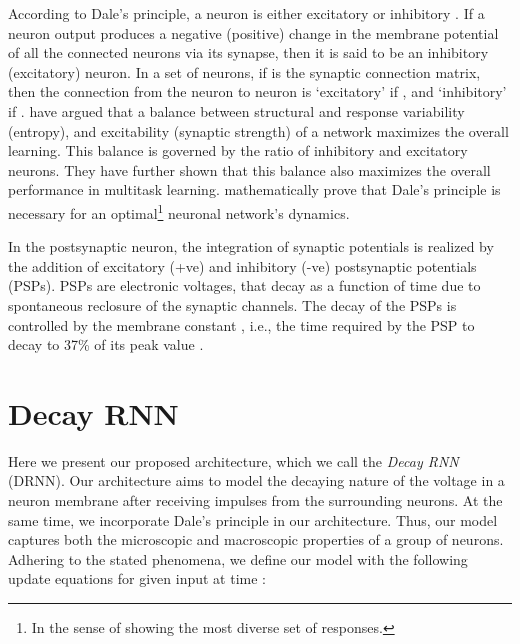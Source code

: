 \documentclass[11pt,a4paper]{article}
\begin{document}
According to Dale's principle, a neuron is either excitatory or inhibitory \cite{eccles1976electrical}. If a neuron output produces a negative (positive) change in the membrane potential of all the connected neurons via its synapse, then it is said to be an inhibitory (excitatory) neuron. In a set of  neurons, if  is the synaptic connection matrix, then the connection from the neuron  to neuron  is `excitatory' if , and `inhibitory' if .  \citet{capano2015optimal} have argued that a balance between structural and response variability (entropy), and excitability (synaptic strength) of a network maximizes the overall learning. This balance is governed by the ratio of inhibitory and excitatory neurons. They have further shown that this balance also maximizes the overall performance in multitask learning. \citet{catsigeras2013dale} mathematically prove that Dale's principle is necessary for an optimal\footnote{In the sense of showing the most diverse set of responses.} neuronal network's dynamics.
 
In the postsynaptic neuron, the integration of synaptic potentials is realized by the addition of excitatory (+ve) and inhibitory (-ve) postsynaptic potentials (PSPs). PSPs are electronic voltages, that decay as a function of time due to spontaneous reclosure of the synaptic channels. The decay of the PSPs is controlled by the membrane constant , i.e., the time required by the PSP to decay to 37\% of its peak value \cite{Wallisch2009}.


\section{Decay RNN}
\label{sec:Decay RNN}
Here we present our proposed architecture, which we call the {\em Decay RNN} (DRNN). Our architecture aims to model the decaying nature of the voltage in a neuron membrane after receiving impulses from the surrounding neurons. At the same time, we incorporate Dale's principle in our architecture. Thus, our model captures both the microscopic and macroscopic properties of a group of neurons. Adhering to the stated phenomena, we define our model with the following update equations for given input  at time :
\begin{center}
    
    
    
\end{center}
\end{document}

